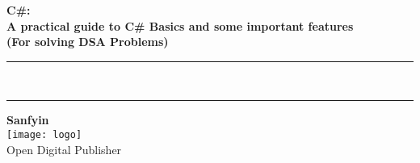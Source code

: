 
{}
{
\centering
\Huge\bfseries C\#:\\
 A practical guide to C\# Basics and some important features\\
 (For solving DSA Problems)\\[-4mm]
\color{red}  
 \rule{\linewidth}{1pt}\\[-6mm]
 \rule{\linewidth}{2pt}
 
}


\vskip3cm
{\noindent \LARGE \bfseries  Sanfyin}\\[5mm]

\vfill 
\texttt{[image: logo]}\\[1mm]
Open Digital Publisher

\clearpage